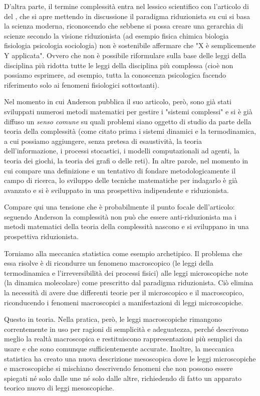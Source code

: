 \documentclass[a4paper, headings=standardclasses]{scrartcl}
\begin{document}
D'altra parte, il termine complessità entra nel lessico scientifico con l'articolo di \citeauthor{anderson1972} del \citeyear{anderson1972} , che si apre mettendo in discussione il paradigma riduzionista su cui si basa la scienza moderna, riconoscendo che sebbene si possa creare una gerarchia di scienze secondo la visione riduzionista (ad esempio fisica \textrightarrow{} chimica \textrightarrow{} biologia \textrightarrow{} fisiologia \textrightarrow{} psicologia \textrightarrow{} sociologia) non è sostenibile affermare che "X è semplicemente Y applicata".
Ovvero che non è possibile riformulare sulla base delle leggi della disciplina più ridotta tutte le leggi della disciplina più complessa (cioè non possiamo esprimere, ad esempio, tutta la conoscenza psicologica facendo riferimento solo ai fenomeni fisiologici sottostanti).

Nel momento in cui Anderson pubblica il suo articolo, però, sono già stati sviluppati numerosi metodi matematici per gestire i "sistemi complessi" e si è già diffuso un \textit{senso comune} su quali problemi siano oggetto di studio da parte della teoria della complessità (come citato prima i sistemi dinamici e la termodinamica, a cui possiamo aggiungere, senza pretesa di esaustività, la teoria dell'informazione, i processi stocastici, i modelli computazionali ad agenti, la teoria dei giochi, la teoria dei grafi o delle reti).
In altre parole, nel momento in cui compare una definizione e un tentativo di fondare metodologicamente il campo di ricerca, lo sviluppo delle tecniche matematiche per indagarlo è già avanzato e si è sviluppato in una prospettiva indipendente e riduzionista.

Compare qui una tensione che è probabilmente il punto focale dell'articolo: seguendo Anderson la complessità non può che essere anti-riduzionista ma i metodi matematici della teoria della complessità nascono e si sviluppano in una prospettiva riduzionista.

Torniamo alla meccanica statistica come esempio archetipico. Il problema che essa risolve è di ricondurre un fenomeno macroscopico (le leggi della termodinamica e l'irreversibilità dei processi fisici) alle leggi microscopiche note (la dinamica molecolare) come prescritto dal paradigma riduzionista.  Ciò elimina la necessità di avere due differenti teorie per il microscopico e il macroscopico, riconducendo i fenomeni macroscopici a manifestazioni di leggi microscopiche.

Questo in teoria. Nella pratica, però, le leggi macroscopiche rimangono correntemente in uso per ragioni di semplicità e adeguatezza, perché descrivono meglio la realtà macroscopica e restituiscono rappresentazioni più semplici da usare e che sono comunque sufficientemente accurate.
Inoltre, la meccanica statistica ha creato una nuova descrizione mesoscopica dove le leggi microscopiche e macroscopiche si mischiano descrivendo fenomeni che non possono essere spiegati né solo dalle une né solo dalle altre, richiedendo di fatto un apparato teorico nuovo di leggi mesoscopiche.
\end{document}
